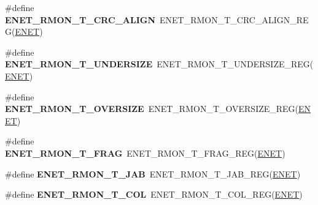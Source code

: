 \begin{DoxyCompactItemize}
\item 
\#define {\bfseries E\+N\+E\+T\+\_\+\+R\+M\+O\+N\+\_\+\+T\+\_\+\+C\+R\+C\+\_\+\+A\+L\+I\+GN}~E\+N\+E\+T\+\_\+\+R\+M\+O\+N\+\_\+\+T\+\_\+\+C\+R\+C\+\_\+\+A\+L\+I\+G\+N\+\_\+\+R\+EG(\hyperlink{group__ENET__Peripheral__Access__Layer_ga4745105f505f3ab949d6a57fbe2a0ed5}{E\+N\+ET})\hypertarget{group__ENET__Register__Accessor__Macros_ga69f8c3aea1ac5b0694446dce0cc4ff6b}{}\label{group__ENET__Register__Accessor__Macros_ga69f8c3aea1ac5b0694446dce0cc4ff6b}

\item 
\#define {\bfseries E\+N\+E\+T\+\_\+\+R\+M\+O\+N\+\_\+\+T\+\_\+\+U\+N\+D\+E\+R\+S\+I\+ZE}~E\+N\+E\+T\+\_\+\+R\+M\+O\+N\+\_\+\+T\+\_\+\+U\+N\+D\+E\+R\+S\+I\+Z\+E\+\_\+\+R\+EG(\hyperlink{group__ENET__Peripheral__Access__Layer_ga4745105f505f3ab949d6a57fbe2a0ed5}{E\+N\+ET})\hypertarget{group__ENET__Register__Accessor__Macros_gac7beffe56548ecad6d37ce6dd73958ff}{}\label{group__ENET__Register__Accessor__Macros_gac7beffe56548ecad6d37ce6dd73958ff}

\item 
\#define {\bfseries E\+N\+E\+T\+\_\+\+R\+M\+O\+N\+\_\+\+T\+\_\+\+O\+V\+E\+R\+S\+I\+ZE}~E\+N\+E\+T\+\_\+\+R\+M\+O\+N\+\_\+\+T\+\_\+\+O\+V\+E\+R\+S\+I\+Z\+E\+\_\+\+R\+EG(\hyperlink{group__ENET__Peripheral__Access__Layer_ga4745105f505f3ab949d6a57fbe2a0ed5}{E\+N\+ET})\hypertarget{group__ENET__Register__Accessor__Macros_ga70b790437654820ef8d2fb4ccd56bac6}{}\label{group__ENET__Register__Accessor__Macros_ga70b790437654820ef8d2fb4ccd56bac6}

\item 
\#define {\bfseries E\+N\+E\+T\+\_\+\+R\+M\+O\+N\+\_\+\+T\+\_\+\+F\+R\+AG}~E\+N\+E\+T\+\_\+\+R\+M\+O\+N\+\_\+\+T\+\_\+\+F\+R\+A\+G\+\_\+\+R\+EG(\hyperlink{group__ENET__Peripheral__Access__Layer_ga4745105f505f3ab949d6a57fbe2a0ed5}{E\+N\+ET})\hypertarget{group__ENET__Register__Accessor__Macros_ga79c1cf9a47efaba14d5ab93b7e760702}{}\label{group__ENET__Register__Accessor__Macros_ga79c1cf9a47efaba14d5ab93b7e760702}

\item 
\#define {\bfseries E\+N\+E\+T\+\_\+\+R\+M\+O\+N\+\_\+\+T\+\_\+\+J\+AB}~E\+N\+E\+T\+\_\+\+R\+M\+O\+N\+\_\+\+T\+\_\+\+J\+A\+B\+\_\+\+R\+EG(\hyperlink{group__ENET__Peripheral__Access__Layer_ga4745105f505f3ab949d6a57fbe2a0ed5}{E\+N\+ET})\hypertarget{group__ENET__Register__Accessor__Macros_gab429b1b2658b8dc8f8900cc50243e7b2}{}\label{group__ENET__Register__Accessor__Macros_gab429b1b2658b8dc8f8900cc50243e7b2}

\item 
\#define {\bfseries E\+N\+E\+T\+\_\+\+R\+M\+O\+N\+\_\+\+T\+\_\+\+C\+OL}~E\+N\+E\+T\+\_\+\+R\+M\+O\+N\+\_\+\+T\+\_\+\+C\+O\+L\+\_\+\+R\+EG(\hyperlink{group__ENET__Peripheral__Access__Layer_ga4745105f505f3ab949d6a57fbe2a0ed5}{E\+N\+ET})\hypertarget{group__ENET__Register__Accessor__Macros_ga4e024726e7b145f433759bf4e343bead}{}\label{group__ENET__Register__Accessor__Macros_ga4e024726e7b145f433759bf4e343bead}


\end{DoxyCompactItemize}
